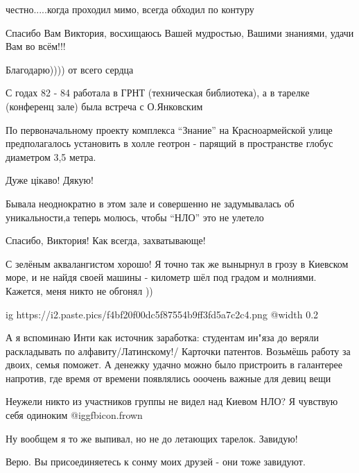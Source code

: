  
 
 
 
 
\zzSecCmt

\begin{itemize} %
честно.....когда проходил мимо, всегда обходил по контуру

Спасибо Вам Виктория, восхищаюсь Вашей мудростью, Вашими знаниями, удачи Вам во всём!!!

Благодарю)))) от всего сердца

С годах 82 - 84 работала в ГРНТ (техническая библиотека), а в тарелке (конференц зале) была встреча с О.Янковским


По первоначальному проекту комплекса \enquote{Знание} на Красноармейской улице
предполагалось установить в холле геотрон - парящий в пространстве глобус
диаметром 3,5 метра.


Дуже цікаво! Дякую!

Бывала неоднократно в этом зале и совершенно не задумывалась об уникальности,а
теперь молюсь, чтобы \enquote{НЛО} это не улетело

Спасибо, Виктория! Как всегда, захватывающе!


С зелёным аквалангистом хорошо! Я точно так же вынырнул в грозу в Киевском
море, и не найдя своей машины - километр шёл под градом и молниями. Кажется,
меня никто не обгонял ))


\ifcmt
  ig https://i2.paste.pics/f4bf20f00dc5f87554b9ff3fd5a7c2c4.png
  @width 0.2
\fi


А я вспоминаю Инти как источник заработка: студентам ин"яза до веряли
раскладывать по алфавиту/Латинскому!/ Карточки патентов. Возьмёшь работу за
двоих, семья поможет. А денежку удачно можно было пристроить в галантерее
напротив, где время от времени появлялись ооочень важные для девиц вещи

Неужели никто из участников группы не видел над Киевом НЛО? Я чувствую себя
одиноким  @igg{fbicon.frown} 

Ну вообщем я то же выпивал, но не до летающих тарелок. Завидую!

Верю. Вы присоединяетесь к сонму моих друзей - они тоже завидуют.

\end{itemize} %
